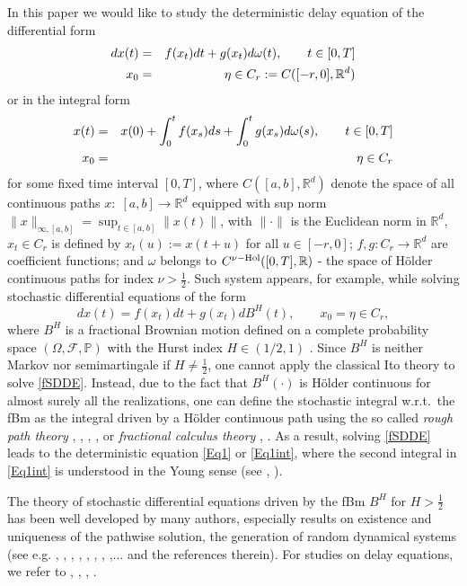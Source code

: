 \documentclass[graybox]{svmult}
\newcommand{\R}{\ensuremath{\mathbb{R}}}
\newcommand{\cF}{\mathcal{F}}
\newcommand{\mP}{\mathbb{P}}
\begin{document}
In this paper we would like to study the deterministic delay equation of the differential form
\begin{eqnarray}\label{Eq1}
dx(t)&=&f(x_t)dt+g(x_t)d\omega(t), \qquad t \in [0,T] \\
x_0&=&\eta\in C_r: = C([-r,0],\R^d) \notag
\end{eqnarray}
or in the integral form
\begin{eqnarray}\label{Eq1int}
x(t)&=&x(0)+ \int_0^t f(x_s)ds+ \int_0^t g(x_s)d\omega(s), \qquad t\in [0,T] \\
x_0&=&\eta\in C_r\notag
\end{eqnarray}
for some fixed time interval $[0,T]$, where $C([a,b],\R^d)$ denote the space of all continuous paths $x:\;[a,b] \to \R^d$ equipped with sup norm $\|x\|_{\infty,[a,b]}=\sup_{t\in [a,b]} \|x(t)\|$,  with $\|\cdot\|$ is the Euclidean norm in $\R^d$, $x_t\in C_r$ is defined by $x_t(u):=x(t+u)$ for all $u\in [-r,0]$; $f,g: C_r\to\R^d$ are coefficient functions; and $\omega$ belongs to $C^{\nu\rm{-Hol}}([0,T],\R)$ - the space of H\"older continuous paths for index $\nu > \frac{1}{2}$. Such system appears, for example, while solving stochastic differential equations of the form
\begin{equation}\label{fSDDE}
dx(t)=f(x_t)dt+g(x_t)dB^H(t), \qquad x_0=\eta\in C_r,
\end{equation}
where $B^H$ is a fractional Brownian motion defined on a complete probability space $(\Omega,\cF,\mP)$ with the Hurst index $H \in (1/2,1)$ \cite{mandelbrot}. Since $B^H$ is neither Markov nor semimartingale if $H \ne \frac{1}{2}$, one cannot apply the classical Ito theory to solve \eqref{fSDDE}. Instead, due to the fact that $B^H(\cdot)$ is H\"older continuous for almost surely all the realizations, one can define the stochastic integral w.r.t.\ the fBm as the integral driven by a H\"older continuous path using the so called {\it rough path theory} \cite{friz}, \cite{lyons98}, \cite{lyonsqian}, \cite{lyonsetal}, or {\it fractional calculus theory} \cite{samko}, \cite{zahle}. As a result, solving \eqref{fSDDE} leads to the deterministic equation \eqref{Eq1} or \eqref{Eq1int}, where the second integral in \eqref{Eq1int} is understood in the Young sense (see \cite{lyons94},  \cite{young}). 

The theory of stochastic differential equations driven by the fBm $B^H$ for $H>\frac{1}{2}$ has been well developed by many authors, especially results on existence and uniqueness of the pathwise solution, the generation of random dynamical systems (see e.g.  \cite{chen}, \cite{congduchong}, \cite{atienza2},  \cite{lejay}, \cite{lyons94},   \cite{nualart2}, \cite{nualart3}, \cite{young},... and the references therein). For studies on delay equations, we refer to \cite{bou1}, \cite{bou2}, \cite{bou3},  \cite{duc-siegmund-schmalfuss}.
\end{document}
